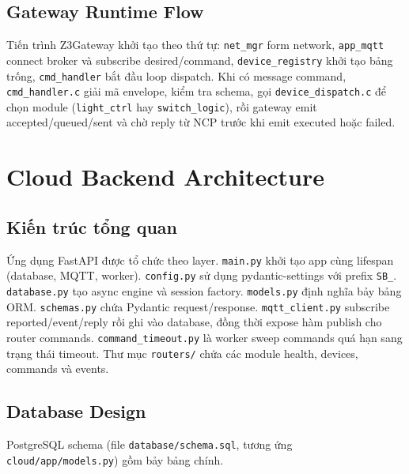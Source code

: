 \subsection{Gateway Runtime Flow}
\label{sec:ch2-app-flow}

Tiến trình Z3Gateway khởi tạo theo thứ tự: \texttt{net\_mgr} form
network, \texttt{app\_mqtt} connect broker và subscribe
desired/command, \texttt{device\_registry} khởi tạo bảng trống,
\texttt{cmd\_handler} bắt đầu loop dispatch. Khi có message command,
\texttt{cmd\_handler.c} giải mã envelope, kiểm tra schema, gọi
\texttt{device\_dispatch.c} để chọn module (\texttt{light\_ctrl} hay
\texttt{switch\_logic}), rồi gateway emit accepted/queued/sent và
chờ reply từ NCP trước khi emit executed hoặc failed.

\section{Cloud Backend Architecture}
\label{sec:ch2-cloud}

\subsection{Kiến trúc tổng quan}
\label{sec:ch2-cloud-arch}

Ứng dụng FastAPI được tổ chức theo layer. \texttt{main.py} khởi tạo
app cùng lifespan (database, MQTT, worker). \texttt{config.py} sử
dụng pydantic-settings với prefix \texttt{SB\_}. \texttt{database.py}
tạo async engine và session factory. \texttt{models.py} định nghĩa
bảy bảng ORM. \texttt{schemas.py} chứa Pydantic request/response.
\texttt{mqtt\_client.py} subscribe reported/event/reply rồi ghi vào
database, đồng thời expose hàm publish cho router commands.
\texttt{command\_timeout.py} là worker sweep commands quá hạn sang
trạng thái timeout. Thư mục \texttt{routers/} chứa các module health,
devices, commands và events.

\subsection{Database Design}
\label{sec:ch2-db-schema}

PostgreSQL schema (file \texttt{database/schema.sql}, tương ứng
\texttt{cloud/app/models.py}) gồm bảy bảng chính.

